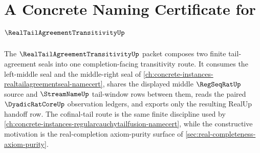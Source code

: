 \chapter{A Concrete Naming Certificate for $\RealTailAgreementTransitivityUp$}
\label{ch:concrete-instances-realtailagreementtransitivity-namecert}

The $\RealTailAgreementTransitivityUp$ packet composes two finite tail-agreement seals into one completion-facing transitivity route. It consumes the left-middle seal and the middle-right seal of \autoref{ch:concrete-instances-realtailagreementseal-namecert}, shares the displayed middle $\RegSeqRatUp$ source and $\StreamNameUp$ tail-window rows between them, reads the paired $\DyadicRatCoreUp$ observation ledgers, and exports only the resulting RealUp handoff row. The cofinal-tail route is the same finite discipline used by \autoref{ch:concrete-instances-regularcauchytailfusion-namecert}, while the constructive motivation is the real-completion axiom-purity surface of \autoref{sec:real-completeness-axiom-purity}.



